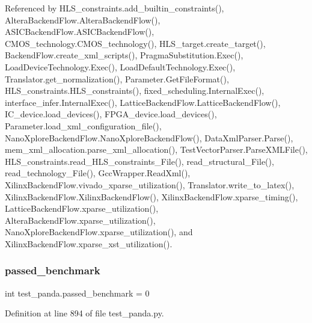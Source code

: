 Referenced by H\+L\+S\+\_\+constraints.\+add\+\_\+builtin\+\_\+constraints(), Altera\+Backend\+Flow.\+Altera\+Backend\+Flow(), A\+S\+I\+C\+Backend\+Flow.\+A\+S\+I\+C\+Backend\+Flow(), C\+M\+O\+S\+\_\+technology.\+C\+M\+O\+S\+\_\+technology(), H\+L\+S\+\_\+target.\+create\+\_\+target(), Backend\+Flow.\+create\+\_\+xml\+\_\+scripts(), Pragma\+Substitution.\+Exec(), Load\+Device\+Technology.\+Exec(), Load\+Default\+Technology.\+Exec(), Translator.\+get\+\_\+normalization(), Parameter.\+Get\+File\+Format(), H\+L\+S\+\_\+constraints.\+H\+L\+S\+\_\+constraints(), fixed\+\_\+scheduling.\+Internal\+Exec(), interface\+\_\+infer.\+Internal\+Exec(), Lattice\+Backend\+Flow.\+Lattice\+Backend\+Flow(), I\+C\+\_\+device.\+load\+\_\+devices(), F\+P\+G\+A\+\_\+device.\+load\+\_\+devices(), Parameter.\+load\+\_\+xml\+\_\+configuration\+\_\+file(), Nano\+Xplore\+Backend\+Flow.\+Nano\+Xplore\+Backend\+Flow(), Data\+Xml\+Parser.\+Parse(), mem\+\_\+xml\+\_\+allocation.\+parse\+\_\+xml\+\_\+allocation(), Test\+Vector\+Parser.\+Parse\+X\+M\+L\+File(), H\+L\+S\+\_\+constraints.\+read\+\_\+\+H\+L\+S\+\_\+constraints\+\_\+\+File(), read\+\_\+structural\+\_\+\+File(), read\+\_\+technology\+\_\+\+File(), Gcc\+Wrapper.\+Read\+Xml(), Xilinx\+Backend\+Flow.\+vivado\+\_\+xparse\+\_\+utilization(), Translator.\+write\+\_\+to\+\_\+latex(), Xilinx\+Backend\+Flow.\+Xilinx\+Backend\+Flow(), Xilinx\+Backend\+Flow.\+xparse\+\_\+timing(), Lattice\+Backend\+Flow.\+xparse\+\_\+utilization(), Altera\+Backend\+Flow.\+xparse\+\_\+utilization(), Nano\+Xplore\+Backend\+Flow.\+xparse\+\_\+utilization(), and Xilinx\+Backend\+Flow.\+xparse\+\_\+xst\+\_\+utilization().

\mbox{\label{namespacetest__panda_aff0bb6b87817523406e38e7c598cb750}} 
\subsubsection{\texorpdfstring{passed\+\_\+benchmark}{passed\_benchmark}}
{\footnotesize\ttfamily int test\+\_\+panda.\+passed\+\_\+benchmark = 0}



Definition at line 894 of file test\+\_\+panda.\+py.

\mbox{\label{namespacetest__panda_ad880cf46896ba48f786953489a5fcddb}} 
